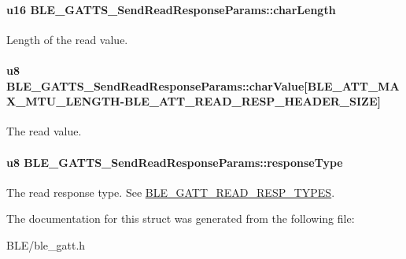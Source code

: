 \paragraph[{\texorpdfstring{char\+Length}{charLength}}]{\setlength{\rightskip}{0pt plus 5cm}u16 B\+L\+E\+\_\+\+G\+A\+T\+T\+S\+\_\+\+Send\+Read\+Response\+Params\+::char\+Length}\hypertarget{struct_b_l_e___g_a_t_t_s___send_read_response_params_aad488f8728f9e064d92e3eb91b6e5a96}{}\label{struct_b_l_e___g_a_t_t_s___send_read_response_params_aad488f8728f9e064d92e3eb91b6e5a96}
Length of the read value. 
\paragraph[{\texorpdfstring{char\+Value}{charValue}}]{\setlength{\rightskip}{0pt plus 5cm}u8 B\+L\+E\+\_\+\+G\+A\+T\+T\+S\+\_\+\+Send\+Read\+Response\+Params\+::char\+Value\mbox{[}{\bf B\+L\+E\+\_\+\+A\+T\+T\+\_\+\+M\+A\+X\+\_\+\+M\+T\+U\+\_\+\+L\+E\+N\+G\+TH}-\/{\bf B\+L\+E\+\_\+\+A\+T\+T\+\_\+\+R\+E\+A\+D\+\_\+\+R\+E\+S\+P\+\_\+\+H\+E\+A\+D\+E\+R\+\_\+\+S\+I\+ZE}\mbox{]}}\hypertarget{struct_b_l_e___g_a_t_t_s___send_read_response_params_a7eed9942abd64d191289d452de715c1b}{}\label{struct_b_l_e___g_a_t_t_s___send_read_response_params_a7eed9942abd64d191289d452de715c1b}
The read value. 
\paragraph[{\texorpdfstring{response\+Type}{responseType}}]{\setlength{\rightskip}{0pt plus 5cm}u8 B\+L\+E\+\_\+\+G\+A\+T\+T\+S\+\_\+\+Send\+Read\+Response\+Params\+::response\+Type}\hypertarget{struct_b_l_e___g_a_t_t_s___send_read_response_params_a562a1738eff391eaf2159c94fdf12009}{}\label{struct_b_l_e___g_a_t_t_s___send_read_response_params_a562a1738eff391eaf2159c94fdf12009}
The read response type. See \hyperlink{group___b_l_e___g_a_t_t___r_e_a_d___r_e_s_p___t_y_p_e_s}{B\+L\+E\+\_\+\+G\+A\+T\+T\+\_\+\+R\+E\+A\+D\+\_\+\+R\+E\+S\+P\+\_\+\+T\+Y\+P\+ES}. 

The documentation for this struct was generated from the following file\+:\begin{DoxyCompactItemize}
\item 
B\+L\+E/ble\+\_\+gatt.\+h\end{DoxyCompactItemize}
